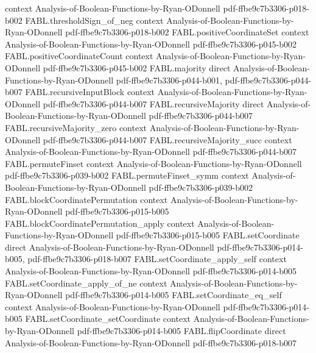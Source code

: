 \begin{theorem}
  {context}
  {Analysis-of-Boolean-Functions-by-Ryan-ODonnell}
  {pdf-ffbe9c7b3306-p018-b002}
\proofstep
  {FABL.thresholdSign_of_neg}
  {context}
  {Analysis-of-Boolean-Functions-by-Ryan-ODonnell}
  {pdf-ffbe9c7b3306-p018-b002}
\proofstep
  {FABL.positiveCoordinateSet}
  {context}
  {Analysis-of-Boolean-Functions-by-Ryan-ODonnell}
  {pdf-ffbe9c7b3306-p045-b002}
\proofstep
  {FABL.positiveCoordinateCount}
  {context}
  {Analysis-of-Boolean-Functions-by-Ryan-ODonnell}
  {pdf-ffbe9c7b3306-p045-b002}
\proofstep
  {FABL.majority}
  {direct}
  {Analysis-of-Boolean-Functions-by-Ryan-ODonnell}
  {pdf-ffbe9c7b3306-p044-b001,
    pdf-ffbe9c7b3306-p044-b007}
\proofstep
  {FABL.recursiveInputBlock}
  {context}
  {Analysis-of-Boolean-Functions-by-Ryan-ODonnell}
  {pdf-ffbe9c7b3306-p044-b007}
\proofstep
  {FABL.recursiveMajority}
  {direct}
  {Analysis-of-Boolean-Functions-by-Ryan-ODonnell}
  {pdf-ffbe9c7b3306-p044-b007}
\proofstep
  {FABL.recursiveMajority_zero}
  {context}
  {Analysis-of-Boolean-Functions-by-Ryan-ODonnell}
  {pdf-ffbe9c7b3306-p044-b007}
\proofstep
  {FABL.recursiveMajority_succ}
  {context}
  {Analysis-of-Boolean-Functions-by-Ryan-ODonnell}
  {pdf-ffbe9c7b3306-p044-b007}
\proofstep
  {FABL.permuteFinset}
  {context}
  {Analysis-of-Boolean-Functions-by-Ryan-ODonnell}
  {pdf-ffbe9c7b3306-p039-b002}
\proofstep
  {FABL.permuteFinset_symm}
  {context}
  {Analysis-of-Boolean-Functions-by-Ryan-ODonnell}
  {pdf-ffbe9c7b3306-p039-b002}
\proofstep
  {FABL.blockCoordinatePermutation}
  {context}
  {Analysis-of-Boolean-Functions-by-Ryan-ODonnell}
  {pdf-ffbe9c7b3306-p015-b005}
\proofstep
  {FABL.blockCoordinatePermutation_apply}
  {context}
  {Analysis-of-Boolean-Functions-by-Ryan-ODonnell}
  {pdf-ffbe9c7b3306-p015-b005}
\proofstep
  {FABL.setCoordinate}
  {direct}
  {Analysis-of-Boolean-Functions-by-Ryan-ODonnell}
  {pdf-ffbe9c7b3306-p014-b005,
    pdf-ffbe9c7b3306-p018-b007}
\proofstep
  {FABL.setCoordinate_apply_self}
  {context}
  {Analysis-of-Boolean-Functions-by-Ryan-ODonnell}
  {pdf-ffbe9c7b3306-p014-b005}
\proofstep
  {FABL.setCoordinate_apply_of_ne}
  {context}
  {Analysis-of-Boolean-Functions-by-Ryan-ODonnell}
  {pdf-ffbe9c7b3306-p014-b005}
\proofstep
  {FABL.setCoordinate_eq_self}
  {context}
  {Analysis-of-Boolean-Functions-by-Ryan-ODonnell}
  {pdf-ffbe9c7b3306-p014-b005}
\proofstep
  {FABL.setCoordinate_setCoordinate}
  {context}
  {Analysis-of-Boolean-Functions-by-Ryan-ODonnell}
  {pdf-ffbe9c7b3306-p014-b005}
\proofstep
  {FABL.flipCoordinate}
  {direct}
  {Analysis-of-Boolean-Functions-by-Ryan-ODonnell}
  {pdf-ffbe9c7b3306-p018-b007}
\proofstep

\end{theorem}
